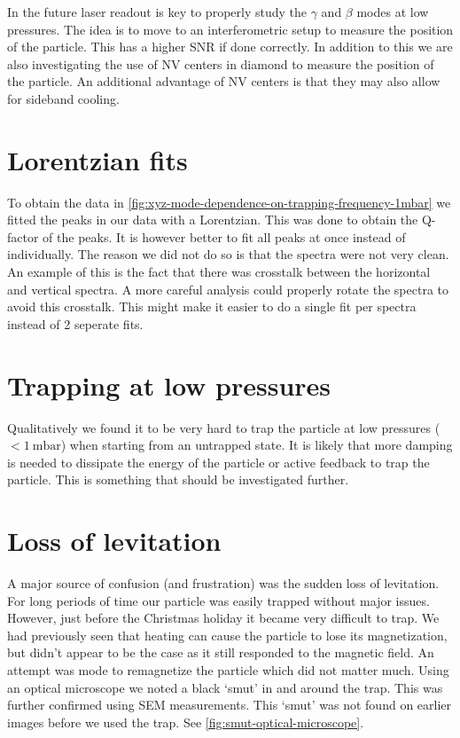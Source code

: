 In the future laser readout is key to properly study the $\gamma$ and $\beta$ modes at low pressures. The idea is to move to an interferometric setup to measure the position of the particle. This has a higher SNR if done correctly. In addition to this we are also investigating the use of NV centers in diamond to measure the position of the particle. An additional advantage of NV centers is that they may also allow for sideband cooling.

\section*{Lorentzian fits}
To obtain the data in \autoref{fig:xyz-mode-dependence-on-trapping-frequency-1mbar} we fitted the peaks in our data with a Lorentzian. This was done to obtain the Q-factor of the peaks. It is however better to fit all peaks at once instead of individually. The reason we did not do so is that the spectra were not very clean. An example of this is the fact that there was crosstalk between the horizontal and vertical spectra. A more careful analysis could properly rotate the spectra to avoid this crosstalk. This might make it easier to do a single fit per spectra instead of 2 seperate fits.

\section*{Trapping at low pressures}
Qualitatively we found it to be very hard to trap the particle at low pressures ($<\qty{1}{\milli\bar}$) when starting from an untrapped state. It is likely that more damping is needed to dissipate the energy of the particle or active feedback to trap the particle. This is something that should be investigated further.

\section*{Loss of levitation}
A major source of confusion (and frustration) was the sudden loss of levitation. For long periods of time our particle was easily trapped without major issues. However, just before the Christmas holiday it became very difficult to trap. We had previously seen that heating can cause the particle to lose its magnetization, but didn't appear to be the case as it still responded to the magnetic field. An attempt was mode to remagnetize the particle which did not matter much. Using an optical microscope we noted a black `smut' in and around the trap. This was further confirmed using SEM measurements. This `smut' was not found on earlier images before we used the trap. See \autoref{fig:smut-optical-microscope}.


